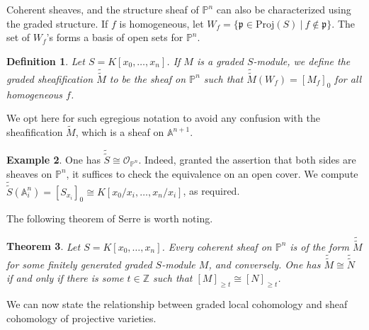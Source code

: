 \documentclass[11pt]{book}
\newtheorem{theorem}{Theorem}[chapter]
\newtheorem{definition}[theorem]{Definition}
\numberwithin{equation}{section}
\numberwithin{theorem}{chapter}
\theoremstyle{definition}
\newtheorem{example}[theorem]{Example}
\newtheorem*{basic properties}{Basic Properties}
\newtheorem*{Important Remark}{Important Remark}
\theoremstyle{remark}
\newcommand{\ZZ}{\mathbb{Z}}
\newcommand{\PP}{\mathbb{P}}
\renewcommand{\AA}{\mathbb{A}}
\newcommand{\p}{\mathfrak{p}}
\newcommand{\dtil}[1]{\widetilde{\widetilde{#1}}}
\begin{document}
Coherent sheaves, and the structure sheaf of $\PP^n$ can also be characterized using the graded structure. If $f$ is homogeneous, let $W_f=\{ \p \in \mathrm{Proj}(S) \ | \ f\notin \p\}$. The set of $W_f$'s forms a basis of open sets for $\PP^n$.

\begin{definition}
	Let $S=K[x_0,\dots, x_n]$. If $M$ is a graded $S$-module, we define the \emph{graded sheafification}\index{$\dtil{M}$} $\dtil{M}$ to be the sheaf on $\PP^n$ such that $\dtil{M}(W_f)=[M_f]_0$ for all homogeneous $f$.
\end{definition}

We opt here for such egregious notation to avoid any confusion with the sheafification $\widetilde{M}$, which is a sheaf on $\AA^{n+1}$.

\begin{example}
	One has $\dtil{S}\cong \mathcal{O}_{\PP^n}$. Indeed, granted the assertion that both sides are sheaves on $\PP^n$, it suffices to check the equivalence on an open cover. We compute $\dtil{S}(\AA^n_i)=[S_{x_i}]_0\cong K[x_0/x_i,\dots,x_n/x_i]$, as required.
\end{example}

The following theorem of Serre is worth noting.

\begin{theorem}
Let $S=K[x_0,\dots, x_n]$. Every coherent sheaf on $\PP^n$ is of the form $\dtil{M}$ for some finitely generated graded $S$-module $M$, and conversely. One has $\dtil{M}\cong \dtil{N}$ if and only if there is some $t\in \ZZ$ such that $[M]_{\geq t}\cong [N]_{\geq t}$.
\end{theorem}


We can now state the relationship between graded local cohomology and sheaf cohomology of projective varieties.
\end{document}
